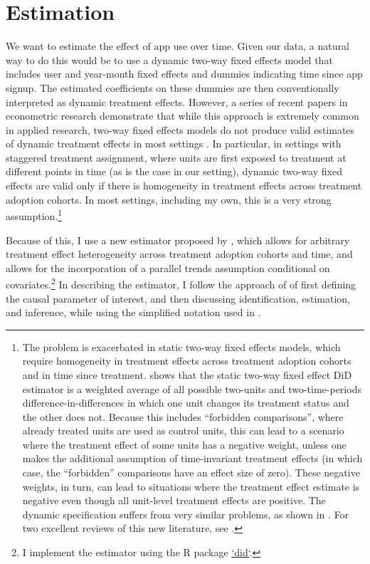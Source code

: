 
\section{Estimation}%
\label{sec:estimation}

We want to estimate the effect of app use over time. Given our data, a natural
way to do this would be to use a dynamic two-way fixed effects model that
includes user and year-month fixed effects and dummies indicating time since
app signup. The estimated coefficients on these dummies are then conventionally
interpreted as dynamic treatment effects. However, a series of recent papers in
econometric research demonstrate that while this approach is extremely common
in applied research, two-way fixed effects models do not produce valid
estimates of dynamic treatment effects in most settings
\citep{roth2022trending}. In particular, in settings with staggered treatment
assignment, where units are first exposed to treatment at different points in
time (as is the case in our setting), dynamic two-way fixed effects are valid
only if there is homogeneity in treatment effects across treatment adoption
cohorts. In most settings, including my own, this is a very strong
assumption.\footnote{The problem is exacerbated in static two-way fixed effects
    models, which require homogeneity in treatment effects across treatment
    adoption cohorts and in time since treatment. \citet{goodman2021difference}
    shows that the static two-way fixed effect DiD estimator is a weighted
    average of all possible two-units and two-time-periods
    difference-in-differences in which one unit changes its treatment status
    and the other does not. Because this includes ``forbidden comparisons'',
    where already treated units are used as control units, this can lead to a
    scenario where the treatment effect of some units has a negative weight,
    unless one makes the additional assumption of time-invariant treatment
    effects (in which case, the ``forbidden'' comparisons have an effect size
    of zero). These negative weights, in turn, can lead to situations where the
    treatment effect estimate is negative even though all unit-level treatment
    effects are positive. The dynamic specification suffers from very similar
    problems, as shown in \citet{sun2021estimating}. For two excellent reviews
of this new literature, see \citet{roth2022trending, baker2022much}.}

Because of this, I use a new estimator proposed by
\citet{callaway2021difference}, which allows for arbitrary treatment effect
heterogeneity across treatment adoption cohorts and time, and allows for the
incorporation of a parallel trends assumption conditional on
covariates.\footnote{I implement the estimator using the R package
\href{https://bcallaway11.github.io/did/}{`did`}.} In
describing the estimator, I follow the approach of
\citet{callaway2021difference} of first defining the causal parameter of
interest, and then discussing identification, estimation, and inference, while
using the simplified notation used in \citet{roth2022trending}.

